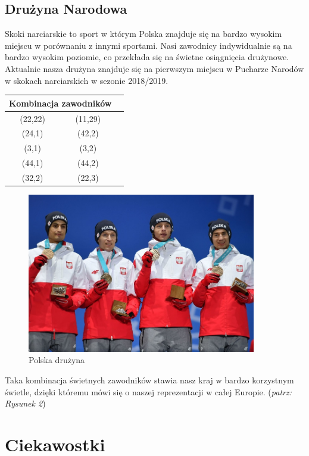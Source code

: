 \documentclass[11pt]{article}
\begin{document}
\subsection{Drużyna Narodowa}
Skoki narciarskie to sport w którym Polska znajduje się na bardzo wysokim miejscu w porównaniu z innymi sportami. Nasi zawodnicy indywidualnie są na bardzo wysokim poziomie, co przekłada się na świetne osiągnięcia drużynowe.
Aktualnie nasza drużyna znajduje się na pierwszym miejscu w Pucharze Narodów w skokach narciarskich w sezonie 2018/2019. 
\newpage 
\begin{center}
\begin{tabular}{||c|c|c||} \hline
\multicolumn{2}{||c||}{Kombinacja zawodników}
\\ \hline \hline
(22,22) & (11,29) \\
(24,1) & (42,2) \\ \hline
(3,1) & (3,2) \\
(44,1) & (44,2) \\ \hline
(32,2) & (22,3) \\ \hline
\end{tabular}
\end{center}
\begin{figure}
\begin{flushleft}
\caption{Polska drużyna}
\includegraphics[width=100mm,height=!]{Druzyna.jpg}
\end{flushleft}
\end{figure}
Taka kombinacja świetnych zawodników stawia nasz kraj w bardzo korzystnym świetle, dzięki któremu mówi się o naszej reprezentacji w całej Europie.
(\textit{\small patrz: Rysunek 2}) \cite{wiki}
\newpage
\section{Ciekawostki}
\end{document}
